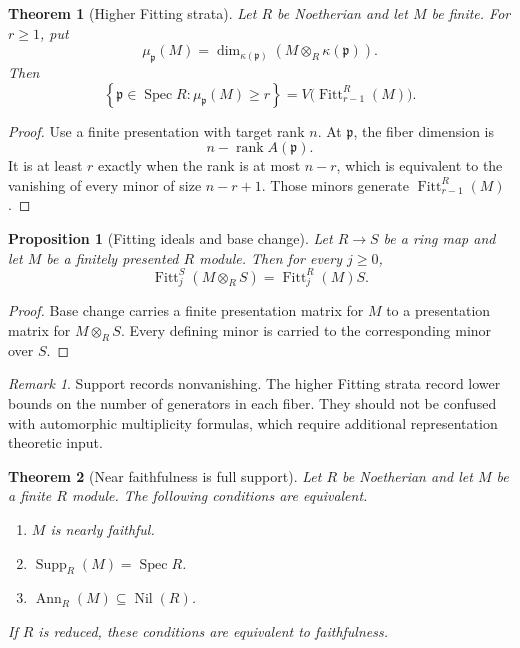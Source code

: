 \documentclass[11pt]{amsart}
\newtheorem{theorem}{Theorem}[section]
\newtheorem{proposition}[proposition]{Proposition}
\theoremstyle{definition}
\theoremstyle{remark}
\newtheorem{remark}[remark]{Remark}
\newcommand{\Spec}{\operatorname{Spec}}
\newcommand{\Supp}{\operatorname{Supp}}
\newcommand{\Ann}{\operatorname{Ann}}
\newcommand{\Fitt}{\operatorname{Fitt}}
\newcommand{\rank}{\operatorname{rank}}
\newcommand{\nil}{\operatorname{Nil}}
\newcommand{\frakp}{\mathfrak p}
\begin{document}
\begin{theorem}[Higher Fitting strata]\label{thm:higher_fitting_strata}
Let \(R\) be Noetherian and let \(M\) be finite. For \(r\geq1\), put
\[
\mu_{\frakp}(M)
=
\dim_{\kappa(\frakp)}
\left(M\otimes_R\kappa(\frakp)\right).
\]
Then
\[
\boxed{
\left\{
\frakp\in\Spec R:
\mu_{\frakp}(M)\geq r
\right\}
=
V\bigl(\Fitt_{r-1}^R(M)\bigr).
}
\]
\end{theorem}

\begin{proof}
Use a finite presentation with target rank \(n\). At \(\frakp\), the fiber dimension is
\[
n-\rank A(\frakp).
\]
It is at least \(r\) exactly when the rank is at most \(n-r\), which is equivalent to the vanishing of every minor of size \(n-r+1\). Those minors generate \(\Fitt_{r-1}^R(M)\).
\end{proof}

\begin{proposition}[Fitting ideals and base change]\label{prop:fitting_base_change}
Let \(R\to S\) be a ring map and let \(M\) be a finitely presented \(R\) module. Then for every \(j\geq0\),
\[
\boxed{
\Fitt_j^S(M\otimes_RS)
=
\Fitt_j^R(M)S.
}
\]
\end{proposition}

\begin{proof}
Base change carries a finite presentation matrix for \(M\) to a presentation matrix for \(M\otimes_RS\). Every defining minor is carried to the corresponding minor over \(S\).
\end{proof}

\begin{remark}
Support records nonvanishing. The higher Fitting strata record lower bounds on the number of generators in each fiber. They should not be confused with automorphic multiplicity formulas, which require additional representation theoretic input.
\end{remark}

\begin{theorem}[Near faithfulness is full support]\label{thm:near_faithful_full_support}
Let \(R\) be Noetherian and let \(M\) be a finite \(R\) module. The following conditions are equivalent.
\begin{enumerate}
\item \(M\) is nearly faithful.
\item \(\Supp_R(M)=\Spec R\).
\item \(\Ann_R(M)\subseteq\nil(R)\).
\end{enumerate}
If \(R\) is reduced, these conditions are equivalent to faithfulness.
\end{theorem}
\end{document}
